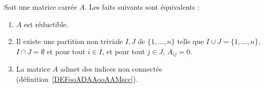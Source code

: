 \begin{proposition}      \label{PROPooZTYDooZAxQxF}
	Soit une matrice carrée \( A\). Les faits suivants sont équivalents :
	\begin{enumerate}
		\item       \label{ITEMooYULAooVqgOnt}
		      \( A\) est réductible.
		\item       \label{ITEMooNLVXooYSQKwO}
		      Il existe une partition non triviale \( I,J\) de \( \{ 1,\ldots, n \}\) telle que \( I\cup J=\{ 1,\ldots, n \}\), \( I\cap J=\emptyset\) et pour tout \( i\in I\), et pour tout \( j\in J\), \( A_{ij}=0\).
		\item       \label{ITEMooVNOHooRUNpwG}
		      La matrice \( A\) admet des indices non connectés (définition~\ref{DEFooADAAooAAMscc}).
	\end{enumerate}
\end{proposition}

